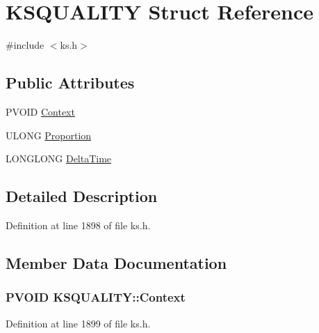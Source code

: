 \hypertarget{struct_k_s_q_u_a_l_i_t_y}{}\section{K\+S\+Q\+U\+A\+L\+I\+TY Struct Reference}
\label{struct_k_s_q_u_a_l_i_t_y}


{\ttfamily \#include $<$ks.\+h$>$}

\subsection*{Public Attributes}
\begin{DoxyCompactItemize}
\item 
P\+V\+O\+ID \hyperlink{struct_k_s_q_u_a_l_i_t_y_a78ad5d8aeec2034ba2c4b5e6d23f6f30}{Context}
\item 
U\+L\+O\+NG \hyperlink{struct_k_s_q_u_a_l_i_t_y_a93fadff43ac8b64a5d19c6eb8f347b85}{Proportion}
\item 
L\+O\+N\+G\+L\+O\+NG \hyperlink{struct_k_s_q_u_a_l_i_t_y_a5312a7a9566d31f658196afcbe90ae14}{Delta\+Time}
\end{DoxyCompactItemize}


\subsection{Detailed Description}


Definition at line 1898 of file ks.\+h.



\subsection{Member Data Documentation}
\subsubsection[{\texorpdfstring{Context}{Context}}]{\setlength{\rightskip}{0pt plus 5cm}P\+V\+O\+ID K\+S\+Q\+U\+A\+L\+I\+T\+Y\+::\+Context}\hypertarget{struct_k_s_q_u_a_l_i_t_y_a78ad5d8aeec2034ba2c4b5e6d23f6f30}{}\label{struct_k_s_q_u_a_l_i_t_y_a78ad5d8aeec2034ba2c4b5e6d23f6f30}


Definition at line 1899 of file ks.\+h.

